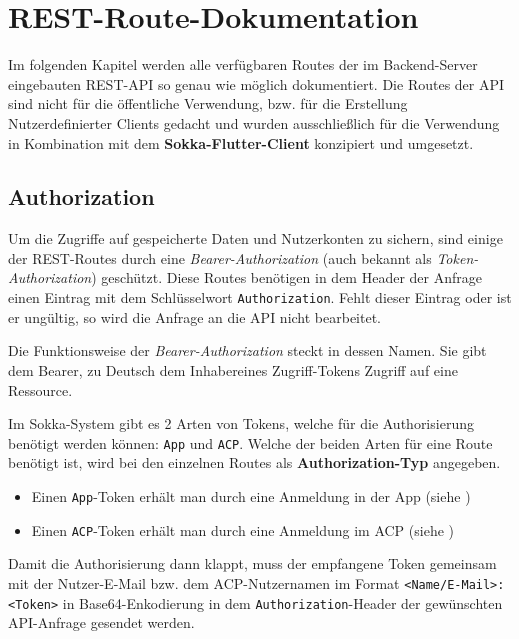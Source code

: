 \chapter{REST-Route-Dokumentation}
\label{restdoc}

Im folgenden Kapitel werden alle verfügbaren Routes der im Backend-Server eingebauten REST-API so genau wie möglich dokumentiert. Die Routes der API sind nicht für die öffentliche Verwendung, bzw. für die Erstellung Nutzerdefinierter Clients gedacht und wurden ausschließlich für die Verwendung in Kombination mit dem \textbf{Sokka-Flutter-Client} konzipiert und umgesetzt.

\section{Authorization}

Um die Zugriffe auf gespeicherte Daten und Nutzerkonten zu sichern, sind einige der REST-Routes durch eine \textit{Bearer-Authorization} (auch bekannt als \textit{Token-Authorization}) geschützt. Diese Routes benötigen in dem Header der Anfrage einen Eintrag mit dem Schlüsselwort \lstinline{Authorization}. Fehlt dieser Eintrag oder ist er ungültig, so wird die Anfrage an die API nicht bearbeitet.

Die Funktionsweise der \textit{Bearer-Authorization} steckt in dessen Namen. Sie gibt dem \glqq Bearer\grqq, zu Deutsch dem \glqq Inhaber\grqq eines Zugriff-Tokens Zugriff auf eine Ressource. \cite{levin2019}

Im Sokka-System gibt es 2 Arten von Tokens, welche für die Authorisierung benötigt werden können: \lstinline{App} und \lstinline{ACP}. Welche der beiden Arten für eine Route benötigt ist, wird bei den einzelnen Routes als \textbf{Authorization-Typ} angegeben.

\begin{itemize}
    \item Einen \lstinline{App}-Token erhält man durch eine Anmeldung in der App (siehe )
    \item Einen \lstinline{ACP}-Token erhält man durch eine Anmeldung im ACP (siehe )
\end{itemize}

Damit die Authorisierung dann klappt, muss der empfangene Token gemeinsam mit der Nutzer-E-Mail bzw. dem ACP-Nutzernamen im Format \lstinline{<Name/E-Mail>:<Token>} in Base64-Enkodierung in dem \lstinline{Authorization}-Header der gewünschten API-Anfrage gesendet werden.

